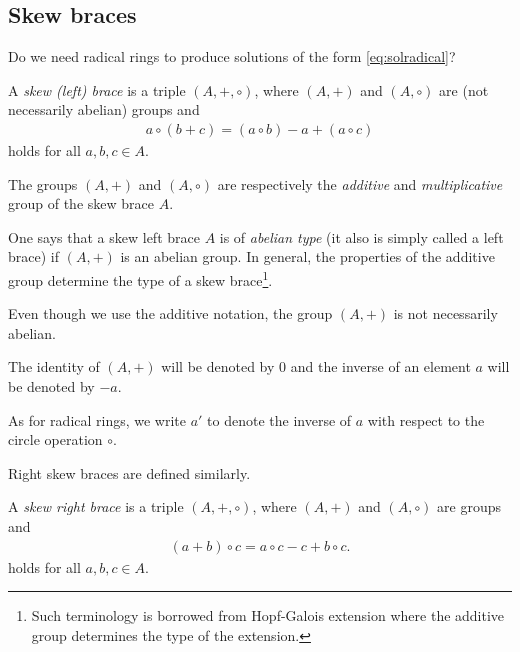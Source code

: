     \subsection{Skew braces}
    Do we need radical rings to produce solutions of the form \eqref{eq:solradical}?

    \begin{definition}
         A \emph{skew (left) brace} is a triple $(A,+,\circ)$, where 
        $(A,+)$ and $(A,\circ)$ 
    	are (not necessarily abelian) 
    	groups and 
    	\begin{align}\label{compatibility}
    	    a\circ(b+c)=(a\circ b)-a+(a\circ c)
    	\end{align}
    	holds for all $a,b,c\in A$. 
    
    The groups $(A,+)$ and $(A,\circ)$ are respectively the \emph{additive} and \emph{multiplicative} group	of the skew brace $A$.
    \end{definition}

    One says that a skew left brace $A$ is of \emph{abelian type} (it also is simply called a left brace) if $(A,+)$ is an abelian group. 
    In general, the properties of the additive group determine the type of a skew brace\footnote{Such terminology is borrowed from Hopf-Galois extension where the additive group determines the type of the extension.}.
    
    \begin{remark}
        Even though we use the additive notation, the group $(A,+)$ is not necessarily abelian.
    \end{remark}

    \begin{convention}
         The identity of $(A,+)$ will be denoted by $0$ and the inverse of an element $a$ will be denoted by $-a$. 

         As for radical rings, we write $a'$ to denote the inverse of $a$ with respect to the circle operation $\circ$. 
    \end{convention}
        
    Right skew braces are defined similarly.

    \begin{definition}
         A \emph{skew right brace} is a triple $(A,+,\circ)$, where 
        $(A,+)$ and $(A,\circ)$ 
	   are groups and 
	   \begin{align*}
	       (a+b)\circ c=a\circ c-c+b\circ c.
	   \end{align*}
	   holds for all $a,b,c\in A$. 
    \end{definition}

